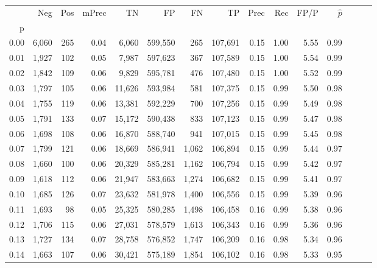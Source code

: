 \begin{tabular}{rrrrrrrrrrrrrrr}
\toprule
{} &     Neg &    Pos & mPrec &       TN &       FP &       FN &       TP &  Prec &   Rec &  FP/P & $\hat{p}$ \\
p    &         &        &       &          &          &          &          &       &       &       &           \\
\midrule
0.00 &   6,060 &    265 &  0.04 &    6,060 &  599,550 &      265 &  107,691 &  0.15 &  1.00 &  5.55 &      0.99 \\
0.01 &   1,927 &    102 &  0.05 &    7,987 &  597,623 &      367 &  107,589 &  0.15 &  1.00 &  5.54 &      0.99 \\
0.02 &   1,842 &    109 &  0.06 &    9,829 &  595,781 &      476 &  107,480 &  0.15 &  1.00 &  5.52 &      0.99 \\
0.03 &   1,797 &    105 &  0.06 &   11,626 &  593,984 &      581 &  107,375 &  0.15 &  0.99 &  5.50 &      0.98 \\
0.04 &   1,755 &    119 &  0.06 &   13,381 &  592,229 &      700 &  107,256 &  0.15 &  0.99 &  5.49 &      0.98 \\
0.05 &   1,791 &    133 &  0.07 &   15,172 &  590,438 &      833 &  107,123 &  0.15 &  0.99 &  5.47 &      0.98 \\
0.06 &   1,698 &    108 &  0.06 &   16,870 &  588,740 &      941 &  107,015 &  0.15 &  0.99 &  5.45 &      0.98 \\
0.07 &   1,799 &    121 &  0.06 &   18,669 &  586,941 &    1,062 &  106,894 &  0.15 &  0.99 &  5.44 &      0.97 \\
0.08 &   1,660 &    100 &  0.06 &   20,329 &  585,281 &    1,162 &  106,794 &  0.15 &  0.99 &  5.42 &      0.97 \\
0.09 &   1,618 &    112 &  0.06 &   21,947 &  583,663 &    1,274 &  106,682 &  0.15 &  0.99 &  5.41 &      0.97 \\
0.10 &   1,685 &    126 &  0.07 &   23,632 &  581,978 &    1,400 &  106,556 &  0.15 &  0.99 &  5.39 &      0.96 \\
0.11 &   1,693 &     98 &  0.05 &   25,325 &  580,285 &    1,498 &  106,458 &  0.16 &  0.99 &  5.38 &      0.96 \\
0.12 &   1,706 &    115 &  0.06 &   27,031 &  578,579 &    1,613 &  106,343 &  0.16 &  0.99 &  5.36 &      0.96 \\
0.13 &   1,727 &    134 &  0.07 &   28,758 &  576,852 &    1,747 &  106,209 &  0.16 &  0.98 &  5.34 &      0.96 \\
0.14 &   1,663 &    107 &  0.06 &   30,421 &  575,189 &    1,854 &  106,102 &  0.16 &  0.98 &  5.33 &      0.95 \\

\end{tabular}
